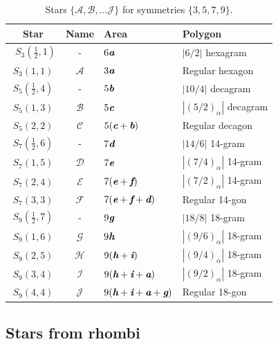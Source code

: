 \documentclass[11pt]{article}
\def\mathbi#1{\textbf{\em #1}}
\begin{document}
\begin{table}[H]
\begin{center}
\begin{tabular}{|c|c|l|l|}
\hline
Star & Name & Area & Polygon \\ \hline\
$S_3(\frac{1}2,1)$ & -     & $6\mathbi{a}$ & $|6/2|$ hexagram \\[0.5ex]
$S_3(1,1)$ & $\mathcal{A}$ & $3\mathbi{a}$ & Regular hexagon \\[0.5ex]
\hline
$S_5(\frac{1}2,4)$ & -      & $5\mathbi{b}$ & $|10/4|$ decagram\\[0.5ex]
$S_5(1,3)$ & $\mathcal{B}$ & $5\mathbi{c}$ & $|(5/2)_\alpha|$ decagram\\[0.5ex]
$S_5(2,2)$ & $\mathcal{C}$ & $5(\mathbi{c}+\mathbi{b})$ & Regular decagon\\[0.5ex]
\hline
$S_7(\frac{1}2,6)$ & -     & $7\mathbi{d}$ & $|14/6|$ 14-gram\\[0.5ex]
$S_7(1,5)$ & $\mathcal{D}$ & $7\mathbi{e}$ & $|(7/4)_\alpha|$ 14-gram\\[0.5ex]
$S_7(2,4)$ & $\mathcal{E}$ & $7(\mathbi{e}+\mathbi{f})$ & $|(7/2)_\alpha|$ 14-gram\\[0.5ex]
$S_7(3,3)$ & $\mathcal{F}$ & $7(\mathbi{e}+\mathbi{f}+\mathbi{d})$ & Regular 14-gon\\[0.5ex]
\hline
$S_9(\frac{1}2,7)$ & -     & $9\mathbi{g}$ & $|18/8|$ 18-gram\\[0.5ex]
$S_9(1,6)$ & $\mathcal{G}$ & $9\mathbi{h}$ & $|(9/6)_\alpha|$ 18-gram\\[0.5ex]
$S_9(2,5)$ & $\mathcal{H}$ & $9(\mathbi{h}+\mathbi{i})$ & $|(9/4)_\alpha|$ 18-gram\\[0.5ex]
$S_9(3,4)$ & $\mathcal{I}$ & $9(\mathbi{h}+\mathbi{i}+\mathbi{a})$ & $|(9/2)_\alpha|$ 18-gram\\[0.5ex]
$S_9(4,4)$ & $\mathcal{J}$ & $9(\mathbi{h}+\mathbi{i}+\mathbi{a}+\mathbi{g})$ & Regular 18-gon\\[0.5ex]
\hline
\end{tabular}
\caption{Stars $\{\mathcal{A},\mathcal{B},...\mathcal{J}\}$ for symmetries $\{3,5,7,9\}$.}
\label{tbl:stars}
\end{center}
\end{table}


\subsection{Stars from rhombi}
\end{document}
